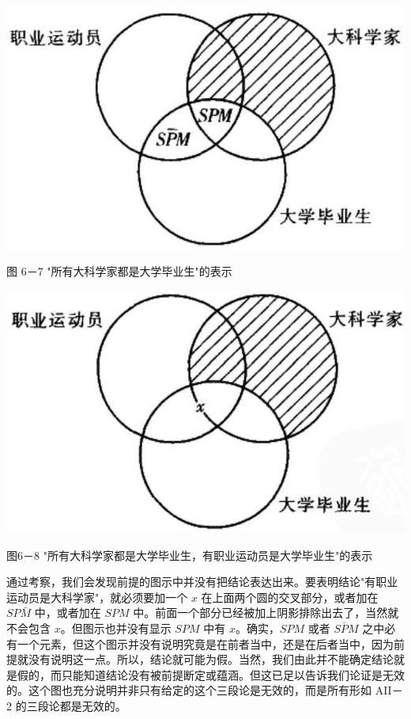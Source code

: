 \begin{center}
\includegraphics[width=\textwidth]{images/2025_05_15_6a28331d5e7c993ad07ag-278.jpg}

图 6－7 "所有大科学家都是大学毕业生"的表示
\end{center}

\begin{center}
\includegraphics[width=\textwidth]{images/2025_05_15_6a28331d5e7c993ad07ag-278(1).jpg}

图6－8 "所有大科学家都是大学毕业生，有职业运动员是大学毕业生"的表示
\end{center}

通过考察，我们会发现前提的图示中并没有把结论表达出来。要表明结论"有职业运动员是大科学家"，就必须要加一个 $x$ 在上面两个圆的交叉部分，或者加在 $SP\bar{M}$ 中，或者加在 $SPM$ 中。前面一个部分已经被加上阴影排除出去了，当然就不会包含 $x$。但图示也并没有显示 $SPM$ 中有 $x$。确实，$SPM$ 或者 $S\bar{P}M$ 之中必有一个元素，但这个图示并没有说明究竟是在前者当中，还是在后者当中，因为前提就没有说明这一点。所以，结论就可能为假。当然，我们由此并不能确定结论就是假的，而只能知道结论没有被前提断定或蕴涵。但这已足以告诉我们论证是无效的。这个图也充分说明并非只有给定的这个三段论是无效的，而是所有形如 AII－2 的三段论都是无效的。

